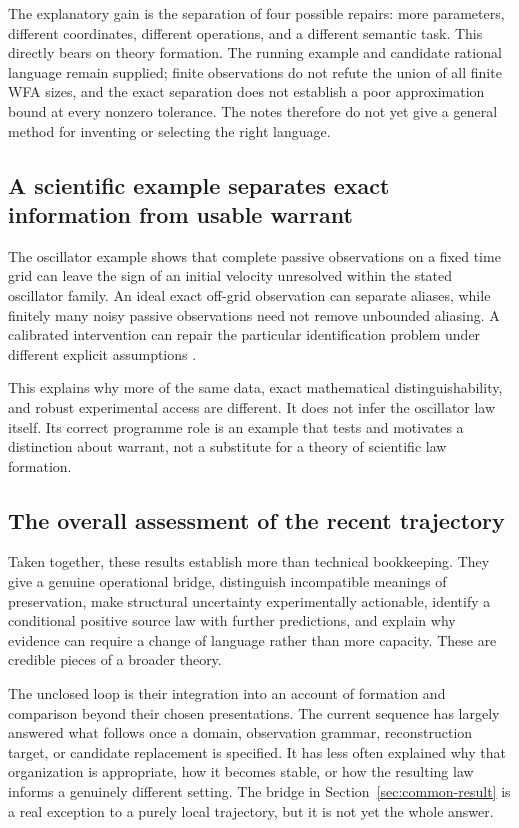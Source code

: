 \documentclass[11pt]{article}
\begin{document}
The explanatory gain is the separation of four possible repairs: more parameters, different coordinates, different operations, and a different semantic task. This directly bears on theory formation. The running example and candidate rational language remain supplied; finite observations do not refute the union of all finite WFA sizes, and the exact separation does not establish a poor approximation bound at every nonzero tolerance. The notes therefore do not yet give a general method for inventing or selecting the right language.

\subsection{A scientific example separates exact information from usable warrant}

The oscillator example shows that complete passive observations on a fixed time grid can leave the sign of an initial velocity unresolved within the stated oscillator family. An ideal exact off-grid observation can separate aliases, while finitely many noisy passive observations need not remove unbounded aliasing. A calibrated intervention can repair the particular identification problem under different explicit assumptions \cite[the scientific example with aliasing and calibrated intervention]{Evidence}.

This explains why more of the same data, exact mathematical distinguishability, and robust experimental access are different. It does not infer the oscillator law itself. Its correct programme role is an example that tests and motivates a distinction about warrant, not a substitute for a theory of scientific law formation.

\subsection{The overall assessment of the recent trajectory}

Taken together, these results establish more than technical bookkeeping. They give a genuine operational bridge, distinguish incompatible meanings of preservation, make structural uncertainty experimentally actionable, identify a conditional positive source law with further predictions, and explain why evidence can require a change of language rather than more capacity. These are credible pieces of a broader theory.

The unclosed loop is their integration into an account of formation and comparison beyond their chosen presentations. The current sequence has largely answered what follows once a domain, observation grammar, reconstruction target, or candidate replacement is specified. It has less often explained why that organization is appropriate, how it becomes stable, or how the resulting law informs a genuinely different setting. The bridge in Section~\ref{sec:common-result} is a real exception to a purely local trajectory, but it is not yet the whole answer.
\end{document}
